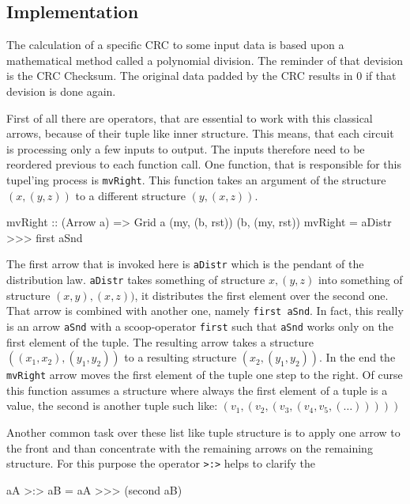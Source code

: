 \documentclass[9pt,final,a4paper,leqno]{article}
\newcommand{\hs}[1]{\mbox{\lstinline[basicstyle=\color{textgray}]!#1!}}
\begin{document}
\subsection{Implementation}
The calculation of a specific CRC to some input data is based upon a mathematical method called a polynomial division. The reminder of that
devision is the CRC Checksum. The original data padded by the CRC results in 0 if that devision is done again. 

\par
First of all there are operators, that are essential to work with this classical arrows, because of their tuple like inner structure. This
means, that each circuit is processing only a few inputs to output. The inputs therefore need to be reordered previous to each function
call. One function, that is responsible for this tupel'ing process is \hs{mvRight}. This function takes an argument of the structure
\((x,(y,z))\) to a different structure \((y,(x,z))\). 

\begin{haskell}
mvRight :: (Arrow a) => Grid a (my, (b, rst)) (b, (my, rst))
mvRight 
  =   aDistr
  >>> first aSnd
\end{haskell} 

The first arrow that is invoked here is \hs{aDistr} which is the pendant of the distribution law. \hs{aDistr} takes something of structure
\(x, (y, z)\) into something of structure \((x, y), (x, z))\), it distributes the first element over the second one. That arrow is combined
with another one, namely \hs{first aSnd}. In fact, this really is an arrow \hs{aSnd} with a scoop-operator \hs{first} such that \hs{aSnd}
works only on the first element of the tuple. The resulting arrow takes a structure \(((x_1,x_2), (y_1,y_2))\) to a resulting structure
\((x_2, (y_1, y_2))\). In the end the \hs{mvRight} arrow moves the first element of the tuple one step to the right. Of curse this function
assumes a structure where always the first element of a tuple is a value, the second is another tuple such like: \((v_1, (v_2, (v_3, (v_4,
v_5, (\dots)))))\)


\par
Another common task over these list like tuple structure is to apply one arrow to the front and than concentrate with the remaining arrows
on the remaining structure. For this purpose the operator \hs{>:>} helps to clarify the 
\begin{haskell}
  aA >:> aB = aA >>> (second aB)
\end{haskell} 
\end{document}
